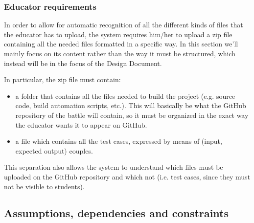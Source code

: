 \subsubsection{Educator requirements}
In order to allow for automatic recognition of all the different kinds of files that the educator has to upload, the system requires him/her to upload a zip file containing all the needed files formatted in a specific way. In this section we'll mainly focus on its content rather than the way it must be structured, which instead will be in the focus of the Design Document. 

In particular, the zip file must contain:
\begin{itemize}
    \item a folder that contains all the files needed to build the project (e.g. source code, build automation scripts, etc.). This will basically be what the GitHub repository of the battle will contain, so it must be organized in the exact way the educator wants it to appear on GitHub.
    \item a file which contains all the test cases, expressed by means of (input, expected output) couples.
\end{itemize}
This separation also allows the system to understand which files must be uploaded on the GitHub repository and which not (i.e. test cases, since they must not be visible to students).

\subsection{Assumptions, dependencies and constraints}
